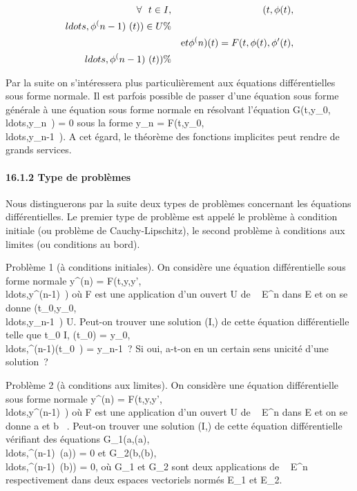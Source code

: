 \documentclass[]{article}
\begin{document}
\begin{align*} \forall~~t \in I,&
&
(t,\phi(t),\\ldots,\phi^(n-1)~(t))
\in U \%& \\ & & \text
et \phi^(n)(t) =
F(t,\phi(t),\phi'(t),\\ldots,\phi^(n-1)~(t))\%&
\\ \end{align*}

Par la suite on s'intéressera plus particulièrement aux équations
différentielles sous forme normale. Il est parfois possible de passer
d'une équation sous forme générale à une équation sous forme normale en
résolvant l'équation
G(t,y\_0,\\ldots,y\_n~)
= 0 sous la forme y\_n =
F(t,y\_0,\\ldots,y\_n-1~).
A cet égard, le théorème des fonctions implicites peut rendre de grands
services.

\paragraph{16.1.2 Type de problèmes}

Nous distinguerons par la suite deux types de problèmes concernant les
équations différentielles. Le premier type de problème est appelé le
problème à condition initiale (ou problème de Cauchy-Lipschitz), le
second problème à conditions aux limites (ou conditions au bord).

Problème 1 (à conditions initiales). On considère une équation
différentielle sous forme normale y^(n) =
F(t,y,y',\\ldots,y^(n-1)~)
où F est une application d'un ouvert U de ~ \times E^n dans E et
on se donne
(t\_0,y\_0,\\ldots,y\_n-1~)
\in U. Peut-on trouver une solution (I,\phi) de cette équation différentielle
telle que t\_0 \in I, \phi(t\_0) =
y\_0,\\ldots,\phi^(n-1)(t\_0~)
= y\_n-1~? Si oui, a-t-on en un certain sens unicité d'une
solution~?

Problème 2 (à conditions aux limites). On considère une équation
différentielle sous forme normale y^(n) =
F(t,y,y',\\ldots,y^(n-1)~)
où F est une application d'un ouvert U de ~ \times E^n dans E et
on se donne a et b \in {}~. Peut-on trouver une solution (I,\phi) de cette
équation différentielle vérifiant des équations
G\_1(a,\phi(a),\\ldots,\phi^(n-1)~(a))
= 0 et
G\_2(b,\phi(b),\\ldots,\phi^(n-1)~(b))
= 0, où G\_1 et G\_2 sont deux applications de ~ \times
E^n respectivement dans deux espaces vectoriels normés
E\_1 et E\_2.
\end{document}
